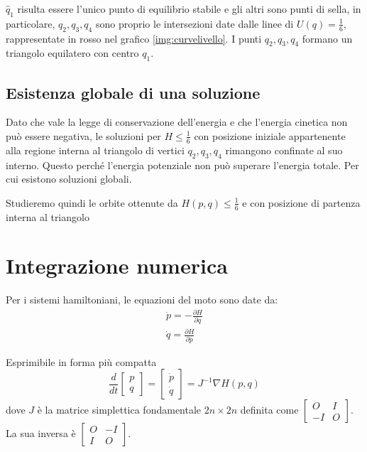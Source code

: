 \documentclass[a4paper, 12pt]{article}
\numberwithin{equation}{section}
\numberwithin{figure}{section}
\begin{document}
$\hat{q}_1$ risulta essere l'unico punto di equilibrio stabile e gli altri sono punti di sella, in particolare,
$q_2, q_3, q_4$ sono proprio le intersezioni date dalle linee di $U(q)=\frac{1}{6}$, rappresentate in rosso nel
grafico \ref{img:curvelivello}. I punti $q_2, q_3, q_4$ formano un triangolo equilatero con centro $q_1$.

\subsection{Esistenza globale di una soluzione}
Dato che vale la legge di conservazione dell'energia e che l'energia cinetica non può essere negativa,
le soluzioni per $H \le \frac{1}{6}$ con posizione iniziale appartenente alla regione interna al triangolo
di vertici $q_2, q_3, q_4$ rimangono confinate al suo interno. Questo perché l'energia potenziale non può
superare l'energia totale. Per cui esistono soluzioni globali.

Studieremo quindi le orbite ottenute da $H(p,q) \le \frac{1}{6}$ e con posizione di partenza interna al triangolo

\section{Integrazione numerica}
Per i sistemi hamiltoniani, le equazioni del moto sono date da:
\begin{eqnarray}
	\dot{p} = -\frac{\partial H}{\partial q}\\
	\dot{q} = \frac{\partial H}{\partial p}
\end{eqnarray}

Esprimibile in forma più compatta
\begin{equation}
	\frac{d}{dt}
	\begin{bmatrix}
		p\\q
	\end{bmatrix} =
	\begin{bmatrix}
		\dot{p}\\\dot{q}
	\end{bmatrix} = 
	J^{-1}\nabla H(p,q)
\end{equation}
dove $J$ è la matrice simplettica fondamentale $2n\times 2n$ definita come $\begin{bmatrix}
O&I\\-I&O \end{bmatrix}$. La sua inversa è $\begin{bmatrix}
O&-I\\I&O \end{bmatrix}$.
\end{document}
